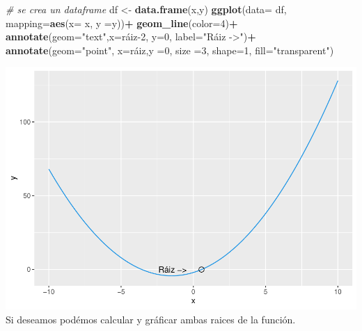 \documentclass[11pt,]{article}
\newenvironment{Shaded}{\begin{snugshade}}{\end{snugshade}}
\newcommand{\CommentTok}[1]{\textcolor[rgb]{0.56,0.35,0.01}{\textit{#1}}}
\newcommand{\DataTypeTok}[1]{\textcolor[rgb]{0.13,0.29,0.53}{#1}}
\newcommand{\DecValTok}[1]{\textcolor[rgb]{0.00,0.00,0.81}{#1}}
\newcommand{\KeywordTok}[1]{\textcolor[rgb]{0.13,0.29,0.53}{\textbf{#1}}}
\newcommand{\NormalTok}[1]{#1}
\newcommand{\OperatorTok}[1]{\textcolor[rgb]{0.81,0.36,0.00}{\textbf{#1}}}
\newcommand{\StringTok}[1]{\textcolor[rgb]{0.31,0.60,0.02}{#1}}
\begin{document}
\begin{Shaded}
\begin{Highlighting}[]
\CommentTok{# se crea un dataframe}
\NormalTok{df <-}\StringTok{ }\KeywordTok{data.frame}\NormalTok{(x,y)  }
\KeywordTok{ggplot}\NormalTok{(}\DataTypeTok{data=}\NormalTok{ df, }\DataTypeTok{mapping=}\KeywordTok{aes}\NormalTok{(}\DataTypeTok{x=}\NormalTok{ x, }\DataTypeTok{y =}\NormalTok{y))}\OperatorTok{+}
\StringTok{  }\KeywordTok{geom_line}\NormalTok{(}\DataTypeTok{color=}\DecValTok{4}\NormalTok{)}\OperatorTok{+}
\StringTok{  }\KeywordTok{annotate}\NormalTok{(}\DataTypeTok{geom=}\StringTok{"text"}\NormalTok{,}\DataTypeTok{x=}\NormalTok{ráiz}\DecValTok{-2}\NormalTok{, }\DataTypeTok{y=}\DecValTok{0}\NormalTok{, }\DataTypeTok{label=}\StringTok{"Ráiz ->"}\NormalTok{)}\OperatorTok{+}
\StringTok{  }\KeywordTok{annotate}\NormalTok{(}\DataTypeTok{geom=}\StringTok{"point"}\NormalTok{, }\DataTypeTok{x=}\NormalTok{ráiz,}\DataTypeTok{y =}\DecValTok{0}\NormalTok{, }\DataTypeTok{size =}\DecValTok{3}\NormalTok{, }\DataTypeTok{shape=}\DecValTok{1}\NormalTok{, }\DataTypeTok{fill=}\StringTok{"transparent"}\NormalTok{)}
\end{Highlighting}
\end{Shaded}

\includegraphics{Newton_raphson_files/figure-latex/unnamed-chunk-4-1.pdf}
\newpage Si deseamos podémos calcular y gráficar ambas raices de la
función.
\end{document}
